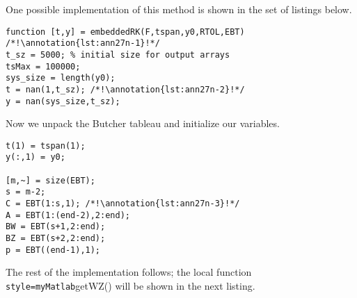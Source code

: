 One possible implementation of this method is shown in the set of listings below.
\begin{lstlisting}[style=myMatlab, name=lec27n-1]
function [t,y] = embeddedRK(F,tspan,y0,RTOL,EBT) /*!\annotation{lst:ann27n-1}!*/
t_sz = 5000; % initial size for output arrays
tsMax = 100000;
sys_size = length(y0);
t = nan(1,t_sz); /*!\annotation{lst:ann27n-2}!*/
y = nan(sys_size,t_sz);
\end{lstlisting}

\noindent Now we unpack the Butcher tableau and initialize our variables.

\begin{lstlisting}[style=myMatlab,name=lec27n-1]
% set initial values
t(1) = tspan(1);
y(:,1) = y0;

[m,~] = size(EBT);
s = m-2;
C = EBT(1:s,1); /*!\annotation{lst:ann27n-3}!*/
A = EBT(1:(end-2),2:end);
BW = EBT(s+1,2:end);
BZ = EBT(s+2,2:end);
p = EBT((end-1),1);
\end{lstlisting}
\noindent The rest of the implementation follows; the local function \lstinline{style=myMatlab}{getWZ()} will be shown in the next listing.


